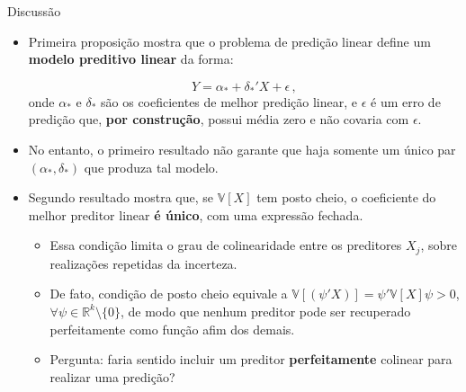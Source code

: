 \documentclass[11pt]{beamer}
\begin{document}
\begin{frame}{Discussão}
	\begin{itemize}
		\item Primeira proposição mostra que o problema de predição linear define um \textbf{modelo preditivo linear} da forma:
		
		$$Y = \alpha_* + \delta_*'X + \epsilon \, ,$$
		onde $\alpha_*$ e $\delta_*$ são os coeficientes de melhor predição linear, e $\epsilon$ é um erro de predição que, \textbf{por construção}, possui média zero e não covaria com $\epsilon$.
		\item No entanto, o primeiro resultado não garante que haja somente um único par $(\alpha_*,\delta_*)$ que produza tal modelo. 
		\item Segundo resultado mostra que, se $\mathbb{V}[X]$ tem posto cheio, o coeficiente do melhor preditor linear \textbf{é único}, com uma expressão fechada.
		\begin{itemize}
		\item Essa condição limita o grau de colinearidade entre os preditores $X_j$, sobre realizações repetidas da incerteza.
		\item De fato, condição de posto cheio equivale a $\mathbb{V}[(\psi'X)]=\psi'\mathbb{V}[X]\psi > 0$, $\forall \psi \in \mathbb{R}^k\setminus\{0\}$, de modo que nenhum preditor pode ser recuperado perfeitamente como função afim dos demais.
		\item Pergunta: faria sentido incluir um preditor \textbf{perfeitamente} colinear para realizar uma predição?
		\end{itemize}
		\end{itemize}
	\end{frame}
	
\end{document}
